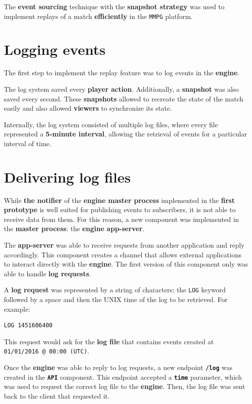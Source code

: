 \documentclass[a4paper,11pt,titlepage,abstract,numbers=noenddot,automark,mnsy,intlimits,rgb,dvipsnames]{report}
\begin{document}
The \textbf{event sourcing} technique with the \textbf{snapshot strategy} was used to implement replays of a match \textbf{efficiently} in
the \texttt{MMPG} platform.
\section{Logging events}
The first step to implement the replay feature was to log events in the \textbf{engine}.

The log system saved every \textbf{player action}. Additionally, a \textbf{snapshot} was also saved every second.
These \textbf{snapshots} allowed to recreate the state of the match easily and also allowed \textbf{viewers} to synchronize its state.

Internally, the log system consisted of multiple log files, where every file represented a \textbf{5-minute interval}, allowing the
retrieval of events for a particular interval of time.
\section{Delivering log files}
While \textbf{the notifier} of the \textbf{engine master process} implemented in the \textbf{first prototype} is well suited for publishing
events to subscribers, it is not able to receive data from them. For this reason, a new component was implemented in the
\textbf{master process}: the \textbf{engine app-server}.

The \textbf{app-server} was able to receive requests from another application and reply accordingly. This component creates a channel that
allows external applications to interact directly with the \textbf{engine}. The first version of this component only was able to handle
\textbf{log requests}.

A \textbf{log request} was represented by a string of characters: the \texttt{LOG} keyword followed by a space and then the UNIX time
of the log to be retrieved. For example:
\begin{verbatim}
LOG 1451606400
\end{verbatim}
This request would ask for the \textbf{log file} that contains events created at \texttt{01/01/2016 @ 00:00 (UTC)}.

Once the \textbf{engine} was able to reply to log requests, a new endpoint \textbf{\texttt{/log}} was created in the \textbf{\texttt{API}} component. This
endpoint accepted a \textbf{\texttt{time}} parameter, which was used to request the correct log file to the \textbf{engine}. Then, the log
file was sent back to the client that requested it.
\end{document}
